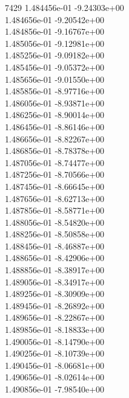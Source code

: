 7429	1.484456e-01	-9.24303e+00	\\ 	1.484656e-01	-9.20542e+00	\\ 	1.484856e-01	-9.16767e+00	\\ 	1.485056e-01	-9.12981e+00	\\ 	1.485256e-01	-9.09182e+00	\\ 	1.485456e-01	-9.05372e+00	\\ 	1.485656e-01	-9.01550e+00	\\ 	1.485856e-01	-8.97716e+00	\\ 	1.486056e-01	-8.93871e+00	\\ 	1.486256e-01	-8.90014e+00	\\ 	1.486456e-01	-8.86146e+00	\\ 	1.486656e-01	-8.82267e+00	\\ 	1.486856e-01	-8.78378e+00	\\ 	1.487056e-01	-8.74477e+00	\\ 	1.487256e-01	-8.70566e+00	\\ 	1.487456e-01	-8.66645e+00	\\ 	1.487656e-01	-8.62713e+00	\\ 	1.487856e-01	-8.58771e+00	\\ 	1.488056e-01	-8.54820e+00	\\ 	1.488256e-01	-8.50858e+00	\\ 	1.488456e-01	-8.46887e+00	\\ 	1.488656e-01	-8.42906e+00	\\ 	1.488856e-01	-8.38917e+00	\\ 	1.489056e-01	-8.34917e+00	\\ 	1.489256e-01	-8.30909e+00	\\ 	1.489456e-01	-8.26892e+00	\\ 	1.489656e-01	-8.22867e+00	\\ 	1.489856e-01	-8.18833e+00	\\ 	1.490056e-01	-8.14790e+00	\\ 	1.490256e-01	-8.10739e+00	\\ 	1.490456e-01	-8.06681e+00	\\ 	1.490656e-01	-8.02614e+00	\\ 	1.490856e-01	-7.98540e+00	\\ \hline
